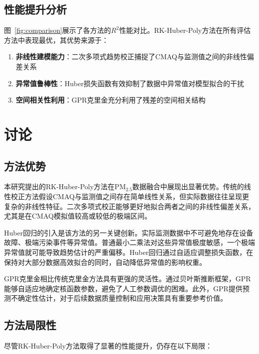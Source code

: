 \documentclass[UTF8, a4paper, 12pt]{article}
\begin{document}
\subsection{性能提升分析}

图~\ref{fig:comparison}展示了各方法的$R^2$性能对比。RK-Huber-Poly方法在所有评估方法中表现最优，其优势来源于：

\begin{enumerate}
    \item \textbf{非线性建模能力}：二次多项式趋势校正捕捉了CMAQ与监测值之间的非线性偏差关系
    \item \textbf{异常值鲁棒性}：Huber损失函数有效抑制了数据中异常值对模型拟合的干扰
    \item \textbf{空间相关性利用}：GPR克里金充分利用了残差的空间相关结构
\end{enumerate}


\section{讨论}

\subsection{方法优势}

本研究提出的RK-Huber-Poly方法在PM$_{2.5}$数据融合中展现出显著优势。传统的线性校正方法假设CMAQ与监测值之间存在简单线性关系，但实际数据往往呈现更复杂的非线性特征。二次多项式校正能够更好地拟合两者之间的非线性偏差关系，尤其是在CMAQ模拟值较高或较低的极端区间。

Huber回归的引入是该方法的另一关键创新。实际监测数据中不可避免地存在设备故障、极端污染事件等异常值。普通最小二乘法对这些异常值极度敏感，一个极端异常值就可能导致趋势估计的严重偏移。Huber回归通过自适应调整损失函数，在保持对大部分数据高效拟合的同时，自动降低异常值的影响权重。

GPR克里金相比传统克里金方法具有更强的灵活性。通过贝叶斯推断框架，GPR能够自适应地确定核函数参数，避免了人工参数调优的困难。此外，GPR提供预测不确定性估计，对于后续数据质量控制和应用决策具有重要参考价值。

\subsection{方法局限性}

尽管RK-Huber-Poly方法取得了显著的性能提升，仍存在以下局限：
\end{document}
